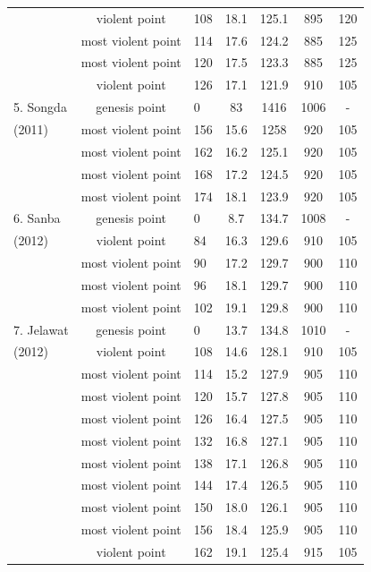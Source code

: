 \documentclass[a4paper, 12pt]{article}
\begin{document}
{\begin{table}[h]
\begin{tabular}{|l|c|l|c|c|c|c|}
&violent point&108&	18.1	&125.1	&895&	120	\\
&most violent point&114&	17.6	&124.2	&885&	125	\\
&most violent point&120&	17.5	&123.3	&885&	125	\\
&violent point&126&	17.1	&121.9	&910&	105	\\\hline
5. Songda&genesis point & 0&	83	&1416&	1006&	-	\\
(2011) &most violent point&156&	15.6	&1258	&920&	105	\\
&most violent point&162&	16.2	&125.1	&920&	105	\\
&most violent point&168&	17.2	&124.5	&920&	105	\\
&most violent point & 174	& 18.1&	123.9	&920&	105\\\hline
6. Sanba&genesis point &0&	8.7&	134.7&	1008&	-	\\
(2012) &violent point&84	&16.3&	129.6&	910	&105	\\
&most violent point&90	&17.2&	129.7&	900	&110	\\
&most violent point&96	&18.1&	129.7&	900	&110\\
&most violent point & 102 &	19.1	&129.8	&900&110\\\hline	
7. Jelawat&genesis point &0	&13.7&	134.8&	1010&	-	\\
(2012) &violent point&108&	14.6	&128.1&	910	&105	\\
&most violent point&114&	15.2	&127.9&	905	&110	\\
&most violent point&120&	15.7&	127.8&	905&	110\\	
&most violent point&126&	16.4&	127.5&	905&	110	\\
&most violent point&132&	16.8&	127.1&	905&	110	\\
&most violent point&138&	17.1&	126.8&	905&	110	\\
&most violent point&144&	17.4&	126.5&	905&	110	\\
&most violent point&150&	18.0&	126.1&	905&	110	\\
&most violent point&156&	18.4&	125.9&	905&	110	\\
&violent point&162&	19.1&	125.4&	915&	105	\\\hline
\end{tabular}
\end{table}


\newpage

}
\end{document}
